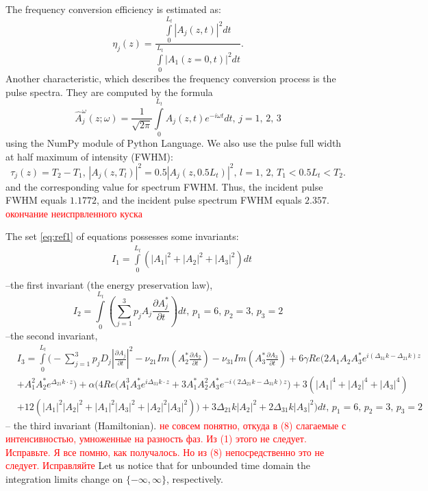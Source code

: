 \documentclass[a4paper, 12pt, onecolumn]{extarticle}
\begin{document}
The frequency conversion efficiency is estimated as:
\begin{equation}
\eta_j(z)=\frac{\int\limits_0^{L_t}|A_j(z,t)|^2dt}{\int\limits_0^{L_t}|A_1(z=0,t)|^2dt}.
\end{equation}
Another characteristic, which describes the frequency conversion process is the pulse spectra. They are computed by the formula
\begin{equation}
\hat{A}_j^\omega(z;\omega)=\frac{1}{\sqrt{2\pi}}\int\limits_{0}^{L_t} A_j(z,t)e^{-i\omega t}dt,\,j=1,\,2,\,3
\end{equation}
using the NumPy module \cite{bib:np} of Python Language. We also use the pulse full width at half maximum of intensity (FWHM):
\[\tau_j(z)=T_2-T_1,\, |A_j(z,T_l)|^2=0.5|A_j(z,0.5L_t)|^2,\,l=1,\,2,\,T_1<0.5L_t<T_2.\]
 and the corresponding value for spectrum FWHM. Thus, the incident pulse FWHM equals \(1.1772\), and the incident pulse spectrum FWHM equals \(2.357\).
 \textcolor{red}{окончание неиспрвленного куска}
 

The set \eqref{eq:ref1} of equations  possesses some invariants:
\begin{equation}
\label{eq:inv1}
\begin{aligned}
&I_1=\int\limits_0^{L_t}\left(|A_1|^2+|A_2|^2+|A_3|^2\right)dt\\
\end{aligned}
\end{equation}
--the first invariant (the energy preservation law),
\begin{equation}
I_2=\int\limits_0^{L_t}\left(\sum\limits_{j=1}^3 p_j A_j \frac{\partial A_j^*}{\partial t}\right)dt,\,p_1=6,\, p_2=3,\, p_3=2
\end{equation}
--the second invariant,
\begin{equation}
\label{eq:inv3}
\begin{aligned}
&I_3=\int\limits_0^{L_t}\Big(-\sum\limits_{j=1}^3 p_jD_j |\frac{\partial A_j}{\partial t}|^2-\nu_{21}Im\left(A_2^*\frac{\partial A_2}{\partial t}\right)-\nu_{31}Im\left(A_3^*\frac{\partial A_3}{\partial t}\right)+6\gamma Re\bigl(2A_1 A_2 A_3^*e^{i(\Delta_{31}k-\Delta_{21}k)z}\\
&+A_1^2 A_2^*e^{\Delta_{21}k\cdot z}\bigr)+\alpha\big(4Re\bigl({A_1^3}{A_3^*}e^{i\Delta_{31}k\cdot z}+3{A_1^*}{A_2^2}{A_3^*}e^{-i(2\Delta_{21}k-\Delta_{31}k)z}\bigr)+3({|A_1|^4}+{|A_2|^4}+{|A_3|^4})\\
&+12({|A_1|^2}{|A_2|^2}+{|A_1|^2}{|A_3|^2}+{|A_2|^2}{|A_3|^2}))+3\Delta_{21} k|A_2|^2+2\Delta_{31} k|A_3|^2\Big)dt,\,p_1=6,\, p_2=3,\, p_3=2
\end{aligned}
\end{equation}
-- the third invariant (Hamiltonian). \textcolor{red}{не совсем понятно, откуда в (8) слагаемые с интенсивностью, умноженные на разность фаз. Из (1) этого не следует. Исправьте. Я все помню, как получалось. Но из (8) непосредственно это не следует. Исправляйте} 
Let us notice that for unbounded time domain the integration limits change on \(\{-\infty,\infty\}\), respectively. 
\end{document}
